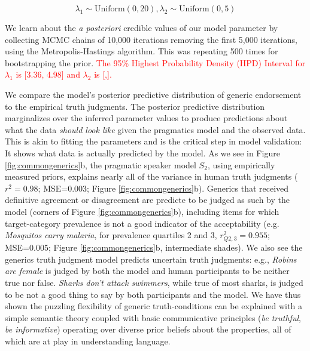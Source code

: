 \documentclass[12pt,letterpaper]{article}
\newcommand{\red}[1]{\textcolor{Red}{#1}}
\begin{document}
$$
\lambda_1 \sim \text{Uniform}(0,20),
\lambda_2 \sim \text{Uniform}(0,5)
$$

We learn about the \emph{a posteriori} credible values of our model parameter by collecting MCMC chains of 10,000 iterations removing the first 5,000 iterations, using the Metropolis-Hastings algorithm. 
This was repeating 500 times for bootstrapping the prior.
\red{The 95\% Highest Probability Density (HPD) Interval for $\lambda_1$ is [3.36, 4.98] and $\lambda_2$ is [,].}

We compare the model's posterior predictive distribution of generic endorsement to the empirical truth judgments.
The posterior predictive distribution marginalizes over the inferred parameter values to produce predictions about what the data \emph{should look like} given the pragmatics model and the observed data. 
This is akin to fitting the parameters and is the critical step in model validation: It shows what data is actually predicted by the model. 
As we see in Figure \ref{fig:commongenerics}b, the pragmatic speaker model $S_2$, using empirically measured priors, explains nearly all of the variance in human truth judgments ($r^2=0.98$; MSE=0.003; Figure \ref{fig:commongenerics}b). 
Generics that received definitive agreement or disagreement are predicte to be judged as such by the model (corners of Figure \ref{fig:commongenerics}b), including items for which target-category prevalence is not a good indicator of the acceptability (e.g. \emph{Mosquitos carry malaria}, for prevalence quartiles 2 and 3, $r_{Q2,3}^2=0.955$; MSE=0.005; Figure \ref{fig:commongenerics}b, intermediate shades).
We also see the generics truth judgment model predicts uncertain truth judgments: e.g., \emph{Robins are female} is judged by both the model and human participants to be neither true nor false.
\emph{Sharks don't attack swimmers}, while true of most sharks, is judged to be not a good thing to say by both participants and the model.
We have thus shown the puzzling flexibility of generic truth-conditions can be explained with a simple semantic theory coupled with basic communicative principles (\emph{be truthful}, \emph{be informative}) operating over diverse prior beliefs about the properties, all of which are at play in understanding language. 

%
\end{document}
